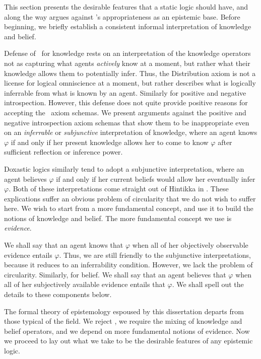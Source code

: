 This section presents the desirable features that a static logic should have, and along the way argues against \SFive's appropriateness as an epistemic base. Before beginning, we briefly establish a consistent informal interpretation of knowledge and belief.

Defense of \SFive\ for knowledge rests on an interpretation of the knowledge operators not as capturing what agents \emph{actively} know at a moment, but rather what their knowledge allows them to potentially infer. Thus, the Distribution axiom is not a license for logical omniscience at a moment, but rather describes what is logically inferrable from what is known by an agent. Similarly for positive and negative introspection. However, this defense does not quite provide positive reasons for accepting the \SFive\ axiom schemas. We present arguments against the positive and negative introspection axiom schemas that show them to be inappropriate even on an \emph{inferrable} or \emph{subjunctive} interpretation of knowledge, where an agent knows $\varphi$ if and only if her present knowledge allows her to come to know $\varphi$ after sufficient reflection or inference power.

Doxastic logics similarly tend to adopt a subjunctive interpretation, where an agent believes $\varphi$ if and only if her current beliefs would allow her eventually infer $\varphi$. Both of these interpretations come straight out of Hintikka in \cite{Hintikka}. These explications suffer an obvious problem of circularity that we do not wish to suffer here. We wish to start from a more fundamental concept, and use it to build the notions of knowledge and belief. The more fundamental concept we use is \emph{evidence}.

We shall say that an agent knows that $\varphi$ when all of her objectively observable evidence entails $\varphi$. Thus, we are still friendly to the subjunctive interpretations, because it reduces to an inferrability condition. However, we lack the problem of circularity. Similarly, for belief. We shall say that an agent believes that $\varphi$ when all of her subjectively available evidence entails that $\varphi$. We shall spell out the details to these components below.

The formal theory of epistemology espoused by this dissertation departs from those typical of the field. We reject \SFive, we require the mixing of knowledge and belief operators, and we depend on more fundamental notions of evidence. Now we proceed to lay out what we take to be the desirable features of any epistemic logic.

